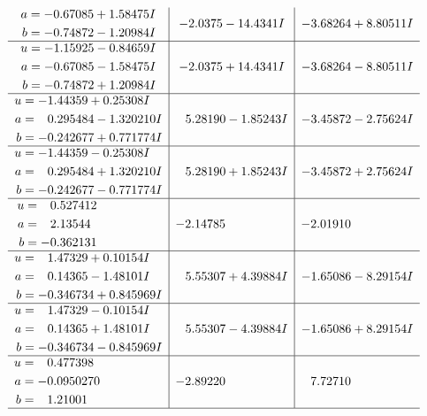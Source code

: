 \documentclass[1p]{elsarticle_modified}
\theoremstyle{definition}
\begin{document}
$$\begin{array}{c|c|c}
\begin{aligned}
a &= -0.67085 + 1.58475 I \\
b &= -0.74872 - 1.20984 I\end{aligned}
 & -2.0375 - 14.4341 I & -3.68264 + 8.80511 I \\ \hline\begin{aligned}
u &= -1.15925 - 0.84659 I \\
a &= -0.67085 - 1.58475 I \\
b &= -0.74872 + 1.20984 I\end{aligned}
 & -2.0375 + 14.4341 I & -3.68264 - 8.80511 I \\ \hline\begin{aligned}
u &= -1.44359 + 0.25308 I \\
a &= \phantom{-}0.295484 - 1.320210 I \\
b &= -0.242677 + 0.771774 I\end{aligned}
 & \phantom{-}5.28190 - 1.85243 I & -3.45872 - 2.75624 I \\ \hline\begin{aligned}
u &= -1.44359 - 0.25308 I \\
a &= \phantom{-}0.295484 + 1.320210 I \\
b &= -0.242677 - 0.771774 I\end{aligned}
 & \phantom{-}5.28190 + 1.85243 I & -3.45872 + 2.75624 I \\ \hline\begin{aligned}
u &= \phantom{-}0.527412\phantom{ +0.000000I} \\
a &= \phantom{-}2.13544\phantom{ +0.000000I} \\
b &= -0.362131\phantom{ +0.000000I}\end{aligned}
 & -2.14785\phantom{ +0.000000I} & -2.01910\phantom{ +0.000000I} \\ \hline\begin{aligned}
u &= \phantom{-}1.47329 + 0.10154 I \\
a &= \phantom{-}0.14365 - 1.48101 I \\
b &= -0.346734 + 0.845969 I\end{aligned}
 & \phantom{-}5.55307 + 4.39884 I & -1.65086 - 8.29154 I \\ \hline\begin{aligned}
u &= \phantom{-}1.47329 - 0.10154 I \\
a &= \phantom{-}0.14365 + 1.48101 I \\
b &= -0.346734 - 0.845969 I\end{aligned}
 & \phantom{-}5.55307 - 4.39884 I & -1.65086 + 8.29154 I \\ \hline\begin{aligned}
u &= \phantom{-}0.477398\phantom{ +0.000000I} \\
a &= -0.0950270\phantom{ +0.000000I} \\
b &= \phantom{-}1.21001\phantom{ +0.000000I}\end{aligned}
 & -2.89220\phantom{ +0.000000I} & \phantom{-}7.72710\phantom{ +0.000000I}\\
 \hline 
 \end{array}$$\newpage\newpage\renewcommand{\arraystretch}{1}
\end{document}
